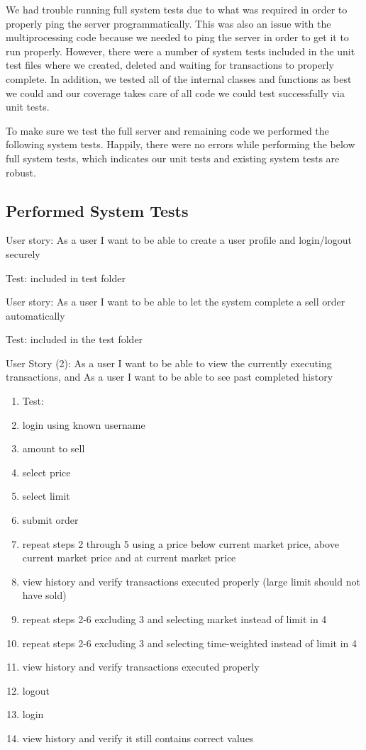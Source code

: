 \documentclass{article}
\begin{document}
We had trouble running full system tests due to what was required in order to properly ping the server programmatically. This was also an issue with the multiprocessing code because we needed to ping the server in order to get it to run properly. However, there were a number of system tests included in the unit test files where we created, deleted and waiting for transactions to properly complete. In addition, we tested all of the internal classes and functions as best we could and our coverage takes care of all code we could test successfully via unit tests.

To make sure we test the full server and remaining code we performed the following system tests. Happily, there were no errors while performing the below full system tests, which indicates our unit tests and existing system tests are robust.

\subsection{Performed System Tests}

User story: As a user I want to be able to create a user profile and login/logout securely

Test: included in test folder

User story: As a user I want to be able to let the system complete a sell order automatically

Test: included in the test folder

User Story (2): As a user I want to be able to view the currently executing transactions, and As a user I want to be able to see past completed history

\begin{enumerate}
\item 
Test:
\item login using known username
\item amount to sell
\item select price
\item select limit
\item submit order
\item repeat steps 2 through 5 using a price below current market price, above current market price and at current market price
\item view history and verify transactions executed properly (large limit should not have sold)
\item repeat steps 2-6 excluding 3 and selecting market instead of limit in 4
\item repeat steps 2-6 excluding 3 and selecting time-weighted instead of limit in 4 
\item view history and verify transactions executed properly
\item logout
\item login
\item view history and verify it still contains correct values
\end{enumerate}
\end{document}
